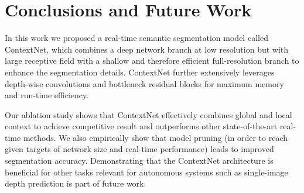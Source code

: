 \documentclass[runningheads]{llncs}
\begin{document}
\section{Conclusions and Future Work}
\label{sec:conclusions}
In this work we proposed a real-time semantic segmentation model called ContextNet, which combines a deep network branch at low resolution but with large receptive field with a shallow and therefore efficient full-resolution branch to enhance the segmentation details.
ContextNet further extensively leverages depth-wise convolutions and bottleneck residual blocks for maximum memory and run-time efficiency.

Our ablation study shows that ContextNet effectively combines global and local context to achieve competitive result and outperforms other state-of-the-art real-time methods. We also empirically show that model pruning (in order to reach given targets of network size and real-time performance) leads to improved segmentation accuracy. Demonstrating that the ContextNet architecture is beneficial for other tasks relevant for autonomous systems such as single-image depth prediction is part of future work.


\end{document}
